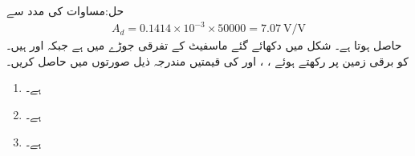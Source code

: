 حل:مساوات  کی مدد سے
\begin{align*}
A_d=0.1414 \times 10^{-3} \times 50000=\SI{7.07}{\volt \per \volt}
\end{align*} 
حاصل ہوتا ہے۔
شکل  میں دکھائے گئے ماسفیٹ کے تفرقی جوڑے میں  ہے جبکہ  اور  ہیں۔ کو برقی زمین پر رکھتے ہوئے  ، ،  اور  کی قیمتیں مندرجہ ذیل صورتوں میں حاصل کریں۔
\begin{enumerate}
\item
{} ہے۔
\item
{} ہے۔
\item
{} ہے۔
\end{enumerate} 

